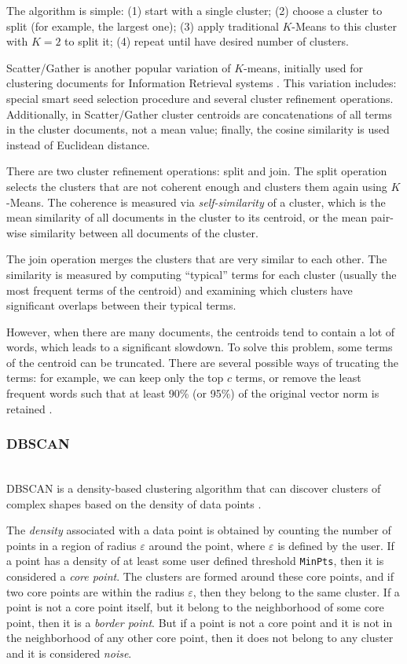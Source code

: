 The algorithm is simple: (1) start with a single cluster;
(2) choose a cluster to split (for example, the largest one);
(3) apply traditional $K$-Means to this cluster with $K=2$ to split it;
(4) repeat until have desired number of clusters.

Scatter/Gather is another popular variation of $K$-means, initially used for
clustering documents for Information Retrieval systems \cite{cutting1992scatter}.
This variation includes: special smart seed selection procedure and
several cluster refinement operations. Additionally, in Scatter/Gather
cluster centroids are concatenations of all terms in the cluster documents,
not a mean value; finally, the cosine similarity is used instead of Euclidean
distance.

There are two cluster refinement operations: split and join.
The split operation selects the clusters that are not coherent
enough and clusters them again using $K$-Means. The coherence is
measured via \emph{self-similarity} of a cluster,
which is the mean similarity of all documents in the cluster to
its centroid, or the mean pair-wise similarity between all documents
of the cluster.

The join operation merges the clusters that are very similar
to each other. The similarity is measured by computing ``typical''
terms for each cluster (usually the most frequent terms of
the centroid) and examining which clusters have significant
overlaps between their typical terms.


However, when there are many documents, the centroids tend
to contain a lot of words, which leads to a significant slowdown.
To solve this problem, some terms of the centroid can be truncated.
There are several possible ways of trucating the terms: for example,
we can keep only the top $c$ terms, or remove the least frequent words
such that at least 90\% (or 95\%) of the original vector norm is
retained \cite{schutze1997projections}.


\subsubsection{DBSCAN} \label{sec:dbscan} \ \\

DBSCAN is a density-based clustering algorithm that can discover
clusters of complex shapes based on the density of data points \cite{ester1996density}.

The \emph{density} associated with a data point is obtained by
counting the number of points in a region of radius $\varepsilon$
around the point, where $\varepsilon$  is defined by the user.
If a point has a density of at least some user defined
threshold \verb|MinPts|, then it is considered a \emph{core point}.
The clusters are formed around these core points, and if two core points
are within the radius $\varepsilon$, then they belong to the same cluster.
If a point is not a core point itself, but it belong to the neighborhood of some
core point, then it is a \emph{border point}. But if a point is not a core point
and it is not in the neighborhood of any other core point, then it does not
belong to any cluster and it is considered \emph{noise}.

